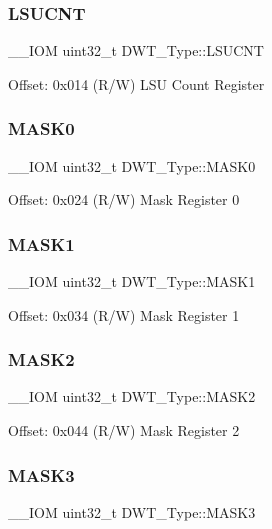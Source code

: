 \subsubsection{\texorpdfstring{LSUCNT}{LSUCNT}}
{\footnotesize\ttfamily \+\_\+\+\_\+\+I\+OM uint32\+\_\+t D\+W\+T\+\_\+\+Type\+::\+L\+S\+U\+C\+NT}

Offset\+: 0x014 (R/W) L\+SU Count Register \mbox{\label{struct_d_w_t___type_a821eb5e71f340ec077efc064cfc567db}} 
\subsubsection{\texorpdfstring{MASK0}{MASK0}}
{\footnotesize\ttfamily \+\_\+\+\_\+\+I\+OM uint32\+\_\+t D\+W\+T\+\_\+\+Type\+::\+M\+A\+S\+K0}

Offset\+: 0x024 (R/W) Mask Register 0 \mbox{\label{struct_d_w_t___type_aabf94936c9340e62fed836dcfb152405}} 
\subsubsection{\texorpdfstring{MASK1}{MASK1}}
{\footnotesize\ttfamily \+\_\+\+\_\+\+I\+OM uint32\+\_\+t D\+W\+T\+\_\+\+Type\+::\+M\+A\+S\+K1}

Offset\+: 0x034 (R/W) Mask Register 1 \mbox{\label{struct_d_w_t___type_a00ac4d830dfe0070a656cda9baed170f}} 
\subsubsection{\texorpdfstring{MASK2}{MASK2}}
{\footnotesize\ttfamily \+\_\+\+\_\+\+I\+OM uint32\+\_\+t D\+W\+T\+\_\+\+Type\+::\+M\+A\+S\+K2}

Offset\+: 0x044 (R/W) Mask Register 2 \mbox{\label{struct_d_w_t___type_a2a509d8505c37a3b64f6b24993df5f3f}} 
\subsubsection{\texorpdfstring{MASK3}{MASK3}}
{\footnotesize\ttfamily \+\_\+\+\_\+\+I\+OM uint32\+\_\+t D\+W\+T\+\_\+\+Type\+::\+M\+A\+S\+K3}

